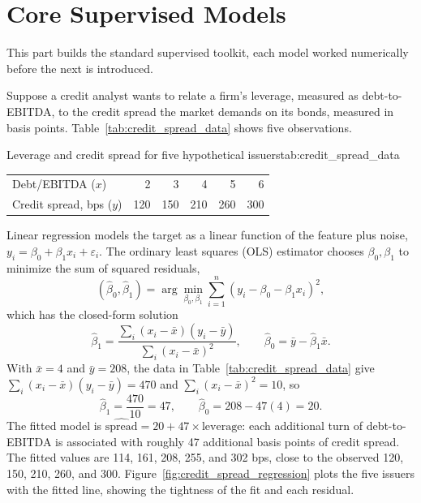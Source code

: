 \documentclass[../ai_in_finance]{subfiles}
\begin{document}
\section{Core Supervised Models}

This part builds the standard supervised toolkit, each model worked numerically before the next is introduced.

\label{sec:regression-example}

Suppose a credit analyst wants to relate a firm's leverage, measured as debt-to-EBITDA, to the credit spread the market demands on its bonds, measured in basis points. Table~\ref{tab:credit_spread_data} shows five observations.

\begin{booktable}[htbp]{Leverage and credit spread for five hypothetical issuers}{tab:credit_spread_data}
\begin{tabular}{lrrrrr}
\toprule
Debt/EBITDA ($x$) & 2 & 3 & 4 & 5 & 6 \\
Credit spread, bps ($y$) & 120 & 150 & 210 & 260 & 300 \\
\bottomrule
\end{tabular}
\end{booktable}

Linear regression models the target as a linear function of the feature plus noise, $y_i = \beta_0 + \beta_1 x_i + \varepsilon_i$. The ordinary least squares (OLS) estimator chooses $\beta_0, \beta_1$ to minimize the sum of squared residuals,
\begin{equation}
\label{eq:ml-ols}
(\hat\beta_0, \hat\beta_1) = \arg\min_{\beta_0,\beta_1} \sum_{i=1}^n \left(y_i - \beta_0 - \beta_1 x_i\right)^2,
\end{equation}
which has the closed-form solution
\begin{equation}
\label{eq:ml-ols-closed-form}
\hat\beta_1 = \frac{\sum_i (x_i - \bar x)(y_i - \bar y)}{\sum_i (x_i - \bar x)^2}, \qquad \hat\beta_0 = \bar y - \hat\beta_1 \bar x.
\end{equation}
With $\bar x = 4$ and $\bar y = 208$, the data in Table~\ref{tab:credit_spread_data} give $\sum_i (x_i-\bar x)(y_i - \bar y) = 470$ and $\sum_i (x_i - \bar x)^2 = 10$, so
\begin{equation*}
\hat\beta_1 = \frac{470}{10} = 47, \qquad \hat\beta_0 = 208 - 47(4) = 20.
\end{equation*}
The fitted model is $\widehat{\text{spread}} = 20 + 47 \times \text{leverage}$: each additional turn of debt-to-EBITDA is associated with roughly 47 additional basis points of credit spread. The fitted values are 114, 161, 208, 255, and 302 bps, close to the observed 120, 150, 210, 260, and 300. Figure~\ref{fig:credit_spread_regression} plots the five issuers with the fitted line, showing the tightness of the fit and each residual.
\end{document}
